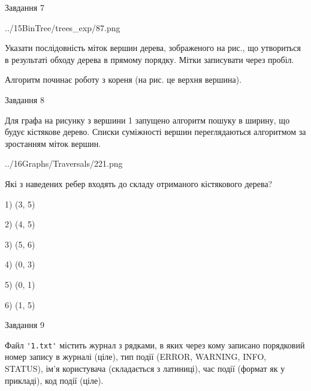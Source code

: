 \documentclass[12pt, ukrainian]{article}
\def\code#1{\Verb!#1!}
\begin{document}
{\vspace{10mm}\par

\newpage
\begin{minipage}[t]{9.7cm}
               
{\begin{center}Завдання {7}\end{center}}
\vspace{-4mm}

\begin{center}
	{../15BinTree/trees_exp/87.png}
\end{center}
Указати послідовність міток вершин дерева, зображеного на рис., що утвориться в результаті обходу дерева в прямому порядку. Мітки записувати через пробіл.\par Алгоритм починає роботу з кореня (на рис. це верхня вершина).\par

\end{minipage}
\vline \hspace{8mm}
\begin{minipage}[t]{8.0cm}
               
{\begin{center}Завдання {8}\end{center}}
\vspace{-4mm}
Для графа на рисунку з вершини 1 запущено алгоритм пошуку в ширину, що будує кістякове дерево. Списки суміжності вершин переглядаються алгоритмом за зростанням міток вершин.\par
\begin{center}
	{../16Graphs/Traversals/221.png}
\end{center}
\par Які з наведених ребер входять до складу отриманого кістякового дерева?\par
1) (3, 5)\par
2) (4, 5)\par
3) (5, 6)\par
4) (0, 3)\par
5) (0, 1)\par
6) (1, 5)\par
{\vskip 15pt} \par

\end{minipage}

               
{\begin{center}Завдання {9}\end{center}}
\vspace{-4mm}
Файл \code{'1.txt'} містить журнал з рядками, в яких через кому записано поряд\-ко\-вий номер запису в журналі (ціле), тип події (ERROR, WARNING, INFO, STATUS), ім'я користувача (складається з латиниці), час події (фор\-мат як у прикладі), код події (ціле).

}
\end{document}
